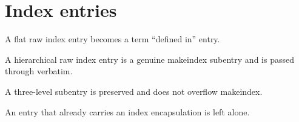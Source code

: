 \section{Index entries}\label{sec:index-entries}

A flat raw index entry becomes a term ``defined in''
entry.

A hierarchical raw index entry is a genuine makeindex subentry and is
passed through verbatim.

A three-level subentry is preserved and does not overflow
makeindex.

An entry that already carries an index encapsulation is left
alone.
